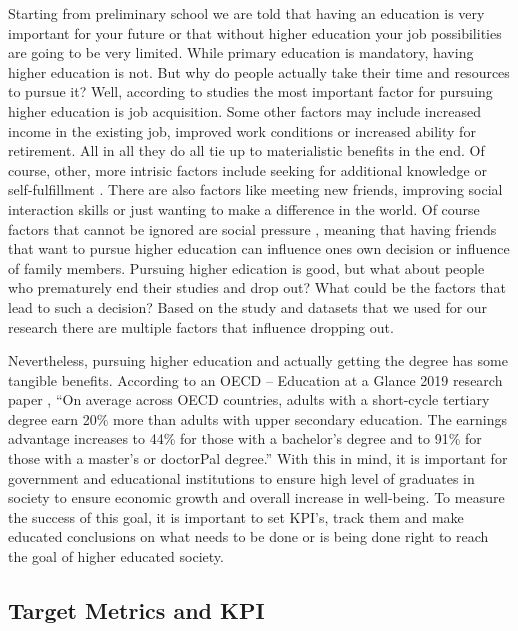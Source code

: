 \documentclass[
  letterpaper,
  DIV=11,
  numbers=noendperiod]{scrartcl}
\begin{document}
Starting from preliminary school we are told that having an education is
very important for your future or that without higher education your job
possibilities are going to be very limited. While primary education is
mandatory, having higher education is not. But why do people actually
take their time and resources to pursue it? Well, according to studies
the most important factor for pursuing higher education is job
acquisition. \autocite{knutsen_motivation_2011} Some other factors may
include increased income in the existing job, improved work conditions
or increased ability for retirement. All in all they do all tie up to
materialistic benefits in the end. Of course, other, more intrisic
factors include seeking for additional knowledge or self-fulfillment
\autocite{cortes_factors_2023}. There are also factors like meeting new
friends, improving social interaction skills or just wanting to make a
difference in the world. Of course factors that cannot be ignored are
social pressure \autocite{temple_factors_2009}, meaning that having
friends that want to pursue higher education can influence ones own
decision or influence of family members. Pursuing higher edication is
good, but what about people who prematurely end their studies and drop
out? What could be the factors that lead to such a decision? Based on
the study and datasets that we used for our research there are multiple
factors that influence dropping out.

Nevertheless, pursuing higher education and actually getting the degree
has some tangible benefits. According to an OECD -- Education at a
Glance 2019 research paper \autocite{oecd_education_2019}, \enquote{On
average across OECD countries, adults with a short-cycle tertiary degree
earn 20\% more than adults with upper secondary education. The earnings
advantage increases to 44\% for those with a bachelor's degree and to
91\% for those with a master's or doctorPal degree.} With this in mind,
it is important for government and educational institutions to ensure
high level of graduates in society to ensure economic growth and overall
increase in well-being. To measure the success of this goal, it is
important to set KPI's, track them and make educated conclusions on what
needs to be done or is being done right to reach the goal of higher
educated society.

\hypertarget{target-metrics-and-kpi}{%
\subsection{Target Metrics and KPI}\label{target-metrics-and-kpi}}
\end{document}

